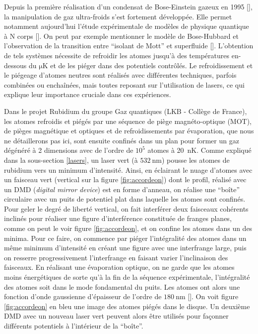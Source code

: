 \documentclass[11pt,a4paper]{article}
\newcommand{\ncite}[1]{[\citenum{#1}]}
\newcommand{\lmbd}[1]{$\SI{#1}{\nano\metre}$}
\begin{document}
Depuis la première réalisation d'un condensat de Bose-Einstein gazeux en 1995 \ncite{anderson, davis}, la manipulation de gaz ultra-froids s'est fortement développée. Elle permet notamment aujourd'hui l'étude expérimentale de modèles de physique quantique à N corps \ncite{bloch}. On peut par exemple mentionner le modèle de Bose-Hubbard et l'observation de la transition entre ``isolant de Mott'' et superfluide \ncite{greiner}. L'obtention de tels systèmes nécessite de refroidir les atomes jusqu'à des températures en-dessous du $\unit{\micro\kelvin}$ et de les piéger dans des potentiels contrôlés. Le refroidissement et le piégeage d'atomes neutres sont réalisés avec différentes techniques, parfois combinées ou enchaînées, mais toutes reposant sur l'utilisation de lasers, ce qui explique leur importance cruciale dans ces expériences.


Dans le projet Rubidium du groupe Gaz quantiques (LKB - Collège de France), les atomes refroidis et piégés par une séquence de piège magnéto-optique (MOT), de pièges magnétique et optiques et de refroidissements par évaporation, que nous ne détaillerons pas ici, sont ensuite confinés dans un plan pour former un gaz dégénéré à 2 dimensions avec de l'ordre de $10^5$ atomes à \SI{20}{nK}. Comme expliqué dans la sous-section \ref{lasers}, un laser vert (à \lmbd{532}) pousse les atomes de rubidium vers un minimum d'intensité. 
Ainsi, en éclairant le nuage d'atomes avec un faisceau vert (vertical sur la figure \ref{fig:accordeon}) dont le profil, réalisé avec un DMD (\textit{digital mirror device}) est en forme d'anneau, on réalise une ``boîte'' circulaire avec un puits de potentiel plat dans laquelle les atomes sont confinés. Pour geler le degré de liberté vertical, on fait interférer deux faisceaux cohérents inclinés pour réaliser une figure d'interférence constituée de franges planes, comme on peut le voir figure \ref{fig:accordeon}, et on confine les atomes dans un des minima. Pour ce faire, on commence par piéger l'intégralité des atomes dans un même minimum d'intensité en créant une figure avec une interfrange large, puis on resserre progressivement l'interfrange en faisant varier l'inclinaison des faisceaux. En réalisant une évaporation optique, on ne garde que les atomes moins énergétiques de sorte qu'à la fin de la séquence expérimentale, l'intégralité des atomes soit dans le mode fondamental du puits. Les atomes ont alors une fonction d'onde gaussienne d'épaisseur de l'ordre de \lmbd{180} \ncite{brice}. On voit figure \ref{fig:accordeon} en bleu une image des atomes piégés dans le disque. Un deuxième DMD avec un nouveau laser vert peuvent alors être utilisés pour façonner différents potentiels à l'intérieur de la ``boîte''.
\end{document}
